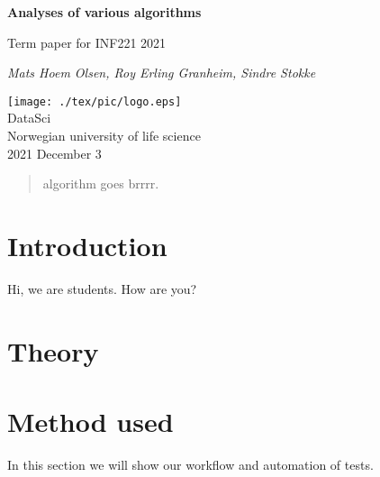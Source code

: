 \documentclass{article}
\begin{document}
\begin{titlepage}
	\begin{center}
		\vspace*{1cm}
		\Huge
		\textbf{Analyses of various algorithms}\\

		\vspace{0.5cm}
		\LARGE

		Term paper for INF221 2021\\

		\vspace{1.5cm}

		\textit{Mats Hoem Olsen, Roy Erling Granheim, Sindre Stokke}\\

		\vfill

		\texttt{[image: ./tex/pic/logo.eps]}\\
		
		\LARGE
		DataSci\\
		Norwegian university of life science\\
		2021 December 3
	\end{center}		
\end{titlepage}

\tableofcontents
\begin{abstract}
algorithm goes brrrr.
\end{abstract}
\newpage

\section{Introduction}

Hi, we are students. How are you?\parencite[see][]{cormen_introduction_2009}

\section{Theory}



\section{Method used}

In this section we will show our workflow and automation of tests.\parencite[look at ][time: 1:23]{brady_haran_death_2020}
\begin{figure}
	\centering
	\def\svgwidth{\columnwidth}
	
\end{figure}
\end{document}
